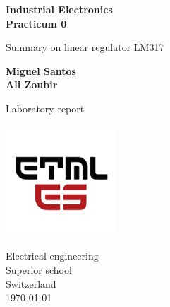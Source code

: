\begin{titlepage}
   \begin{center}
        \vspace*{1cm}
        \LARGE
        \textbf{Industrial Electronics \\ Practicum 0}
        
        \vspace{0.3cm}
        Summary on linear regulator LM317
            
        \vspace{1.5cm}

        \textbf{Miguel Santos \\ Ali Zoubir}

        \vfill
            
        Laboratory report
            
        \vspace{0.8cm}
     
        \includegraphics[width=0.31\textwidth]{../ETML-ES-LOGO.png}

        Electrical engineering\\
        Superior school\\
        Switzerland\\
        \monthyeardate\today
            
   \end{center}
\end{titlepage}